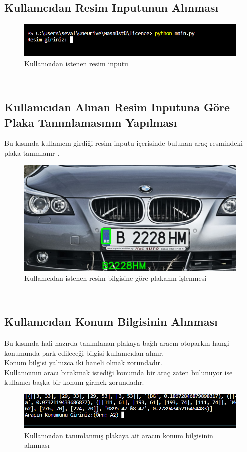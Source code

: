 \subsection{Kullanıcıdan Resim Inputunun Alınması}
 \begin{figure}
    \centering
    \includegraphics{kullanıcıdan resim girdisi alma.PNG}
    \caption{Kullanıcıdan istenen resim inputu }
    \label{fig:my_label}
\end{figure} \\
\subsection{Kullanıcıdan Alınan Resim Inputuna Göre Plaka Tanımlamasının Yapılması}
Bu kısımda kullanıcın girdiği resim inputu içerisinde bulunan araç resmindeki plaka tanımlanır .
 \begin{figure}
    \centering
    \includegraphics{plaka tanındı.PNG}
    \caption{Kullanıcıdan istenen resim bilgisine göre plakanın işlenmesi }
    \label{fig:my_label}
\end{figure} \\

\subsection{Kullanıcıdan Konum Bilgisinin Alınması}
Bu kısımda hali hazırda tanımlanan plakaya bağlı aracın otoparkın hangi konumunda park edileceği bilgisi kullanıcıdan alınır. \\
Konum bilgisi yalnızca iki haneli olmak zorundadır.\\
Kullanıcının aracı bırakmak istediği konumda bir araç zaten bulunuyor ise kullanıcı başka bir konum girmek zorundadır.\\
 \begin{figure}
    \centering
    \includegraphics{konum bilgisinin alınması.PNG}
    \caption{Kullanıcıdan tanımlanmış plakaya ait aracın konum bilgisinin alınması }
    \label{fig:my_label}
\end{figure} \\

